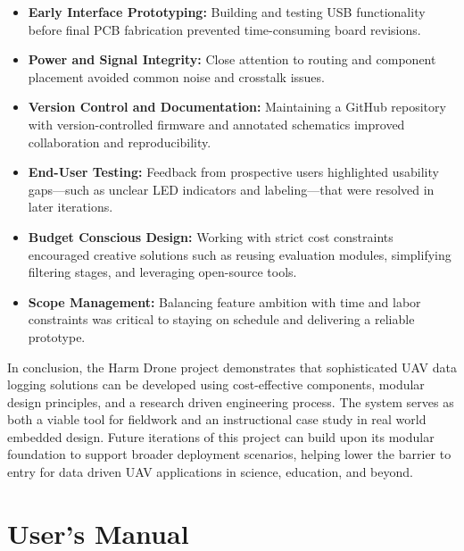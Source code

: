 \documentclass[12pt]{article}
\begin{document}
\begin{itemize}
\item \textbf{Early Interface Prototyping:} Building and testing USB functionality before final PCB fabrication prevented time-consuming board revisions.
\item \textbf{Power and Signal Integrity:} Close attention to routing and component placement avoided common noise and crosstalk issues.
\item \textbf{Version Control and Documentation:} Maintaining a GitHub repository with version-controlled firmware and annotated schematics improved collaboration and reproducibility.
\item \textbf{End-User Testing:} Feedback from prospective users highlighted usability gaps—such as unclear LED indicators and labeling—that were resolved in later iterations.
\item \textbf{Budget Conscious Design:} Working with strict cost constraints encouraged creative solutions such as reusing evaluation modules, simplifying filtering stages, and leveraging open-source tools.
\item \textbf{Scope Management:} Balancing feature ambition with time and labor constraints was critical to staying on schedule and delivering a reliable prototype.
\end{itemize}

\par In conclusion, the Harm Drone project demonstrates that sophisticated UAV data logging solutions can be developed using cost-effective components, modular design principles, and a research driven engineering process. The system serves as both a viable tool for fieldwork and an instructional case study in real world embedded design. Future iterations of this project can build upon its modular foundation to support broader deployment scenarios, helping lower the barrier to entry for data driven UAV applications in science, education, and beyond.

\section{User’s Manual}
\end{document}
